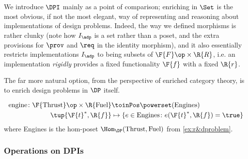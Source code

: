 We introduce $\DPI$ mainly as a point of comparison; enriching in $\Set$ is the most obvious, if not the most elegant, way of representing and reasoning about implementations of design problems. Indeed, the way we defined morphisms is rather clunky (note how $I_\adp$ is a set rather than a poset, and the extra provisions for $\prov$ and $\req$ in the identity morphism), and it also essentially restricts implementations $I_\adp$ to being subsets of $\F{F}\op \times \R{R}$, i.e. an implementation \emph{rigidly} provides a fixed functionality $\F{f}$ with a fixed $\R{r}$.

The far more natural option, from the perspective of enriched category theory, is to enrich design problems in $\DP$ itself.

\begin{example}
\begin{equation}
\begin{aligned}
\text{engine} \colon \F{\text{Thrust}}\op \times \R{\text{Fuel}} &\toinPos \powerset(\text{Engines}) \\
\tup{\F{t}^*,\R{f}} &\mapsto \{ e \in \text{Engines} \colon e(\F{t}^*, \R{f}) = \true \}
\end{aligned}
\end{equation}
where Engines is the hom-poset $\Hom_\DP(\text{Thrust}, \text{Fuel})$ from \cref{ex:r&dproblem}.
\end{example}


\subsubsection{Operations on DPIs}




